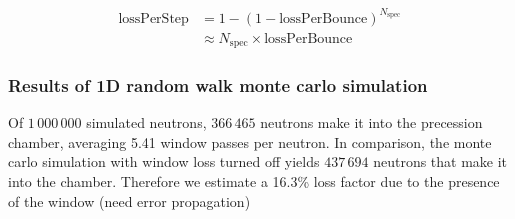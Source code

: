 \begin{align}
    \text{lossPerStep} &= 1 - \left(1 - \text{lossPerBounce} \right)^{N_\text{spec}}\\
    &\approx N_\text{spec} \times \text{lossPerBounce}
\end{align}

\subsubsection{Results of 1D random walk monte carlo simulation}

Of $1\,000\,000$ simulated neutrons, $366\,465$ neutrons make it into the precession chamber, averaging 5.41 window passes per neutron. In comparison, the monte carlo simulation with window loss turned off yields $437\,694$ neutrons that make it into the chamber. Therefore we estimate a 16.3\% loss factor due to the presence of the window (need error propagation)